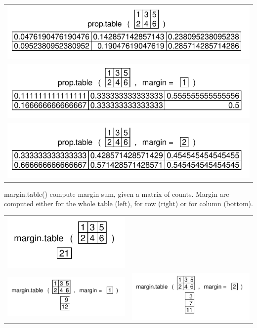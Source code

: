 \documentclass[pdflatex]{article}
\begin{document}
\begin{tabular}{c}
\includegraphics{prop_table1}\\
\includegraphics{prop_table_row}\\
\includegraphics{prop_table_column}
\end{tabular}

margin.table() compute margin sum, given a matrix of counts. Margin are
computed either for the whole table (left), for row (right) or for column
(bottom).

\begin{tabular}{cc}
\includegraphics{margin_table1} & \\
\includegraphics{margin_table_row} &  \includegraphics{margin_table_column}
\end{tabular}
\end{document}
